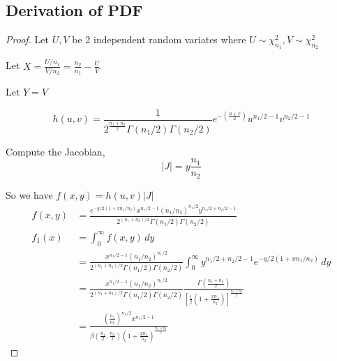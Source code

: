 \documentclass[oneside,11pt,pdftex]{book}%
\numberwithin{equation}{section}
\numberwithin{section}{chapter}
\numberwithin{equation}{chapter}
\begin{document}
\subsection{Derivation of PDF}
\begin{proof}
	Let $ U,V $ be 2 independent random variates where $ U \sim \chi^2_{n_1} ,V \sim \chi^2_{n_2}$
	
	Let $ X=\frac{U/n_1}{V/n_2} =\frac{n_2}{n_1}-\frac{U}{V}$
	
	Let $ Y=V $
	
	$$ h(u,v)=\frac{1}{2^{\frac{n_1+n_2}{2}}\Gamma(n_1/2)\Gamma(n_2/2)} e^{-\left(\frac{u+v}{2}\right)} u^{n_1/2-1}v^{n_2/2-1} $$
	
	Compute the Jacobian,
	\[ |J|= y \frac{n_1}{n_2}\]
	
	So we have $ f(x,y)=h(u,v) |J| $
	\begin{align*}
		f(x,y)&=\frac{e^{-y/2(1+xn_1/n_2)}x^{n_1/2-1}(n_1/n_2)^{n_1/2}y^{n_1/2+n_2/2-1}}{2^{(n_1+n_2)/2}\Gamma(n_1/2)\Gamma(n_2/2)}\\
		f_1(x)&=\int_0^\infty f(x,y)\, dy\\
		&=\frac{x^{n_1/2-1}(n_1/n_2)^{n_1/2}}{2^{(n_1+n_2)/2}\Gamma(n_1/2)\Gamma(n_2/2)} \int_0^\infty y^{n_1/2+n_2/2-1}e^{-y/2(1+xn_1/n_2)}\, dy\\
		&=\frac{x^{n_1/2-1}(n_1/n_2)^{n_1/2}}{2^{(n_1+n_2)/2}\Gamma(n_1/2)\Gamma(n_2/2)} \frac{\Gamma\left(\frac{n_1+n_2}{2}\right)}{\left[\frac{1}{2}\left(1+\frac{xn_1}{n_2}\right)\right]^{\frac{n_1+n_2}{2}}}\\
		&=\frac{\left(\frac{n_1}{n_2}\right)^{n_1/2}x^{n_1/2-1}}{\beta\left(\frac{n_1}{2},\frac{n_2}{2}\right)\left(1+\frac{xn_1}{n_2}\right)^{\frac{n_1+n_2}{2}}}
	\end{align*}
\end{proof}
\end{document}
